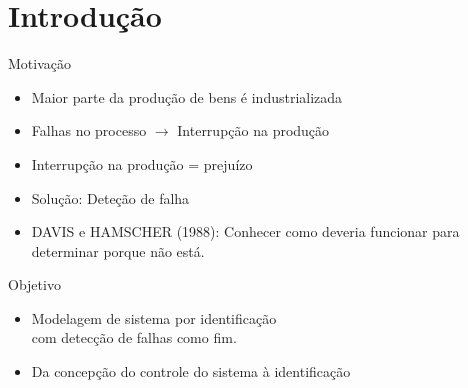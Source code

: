 
\section{Introdução}


\begin{frame}{Motivação}
\begin{itemize}
\item Maior parte da produção de bens é industrializada \pause
\item Falhas no processo $\rightarrow$ Interrupção na produção \pause
\item Interrupção na produção = prejuízo \pause 
\item Solução: Deteção de falha \pause
\item DAVIS e HAMSCHER (1988): Conhecer como deveria funcionar para determinar
  porque não está.
\end{itemize}
\end{frame}

\begin{frame}{Objetivo}
\begin{itemize}
\item Modelagem de sistema por identificação \\com detecção de falhas como fim.
  \pause
\item Da concepção do controle do sistema à identificação 
\end{itemize}
\end{frame}


